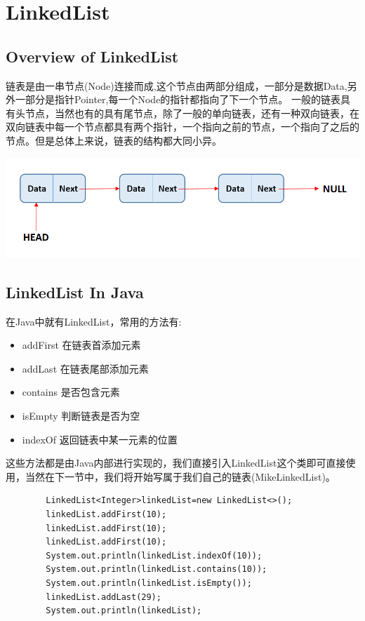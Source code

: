\documentclass[
	11pt,
	fleqn,
	a4paper,
]{LegrandOrangeBook}
\begin{document}
\chapter{LinkedList}
\section{Overview of LinkedList}
链表是由一串节点(Node)连接而成,这个节点由两部分组成，一部分是数据Data,另外一部分是指针Pointer,每一个Node的指针都指向了下一个节点。
一般的链表具有头节点，当然也有的具有尾节点，除了一般的单向链表，还有一种双向链表，在双向链表中每一个节点都具有两个指针，一个指向之前的节点，一个指向了之后的节点。但是总体上来说，链表的结构都大同小异。

\begin{center}
	\includegraphics[scale=0.8]{Images/linked-list.jpg}
\end{center}
\section{LinkedList In Java}
在Java中就有LinkedList，常用的方法有:
\begin{itemize}
	\item addFirst 在链表首添加元素
	\item addLast 在链表尾部添加元素
	\item contains 是否包含元素
	\item isEmpty 判断链表是否为空
	\item indexOf 返回链表中某一元素的位置
\end{itemize}
这些方法都是由Java内部进行实现的，我们直接引入LinkedList这个类即可直接使用，当然在下一节中，我们将开始写属于我们自己的链表(MikeLinkedList)。

\begin{verbatim}
        LinkedList<Integer>linkedList=new LinkedList<>();
        linkedList.addFirst(10);
        linkedList.addFirst(10);
        linkedList.addFirst(10);
        System.out.println(linkedList.indexOf(10));
        System.out.println(linkedList.contains(10));
        System.out.println(linkedList.isEmpty());
        linkedList.addLast(29);
        System.out.println(linkedList);
\end{verbatim}
\end{document}
